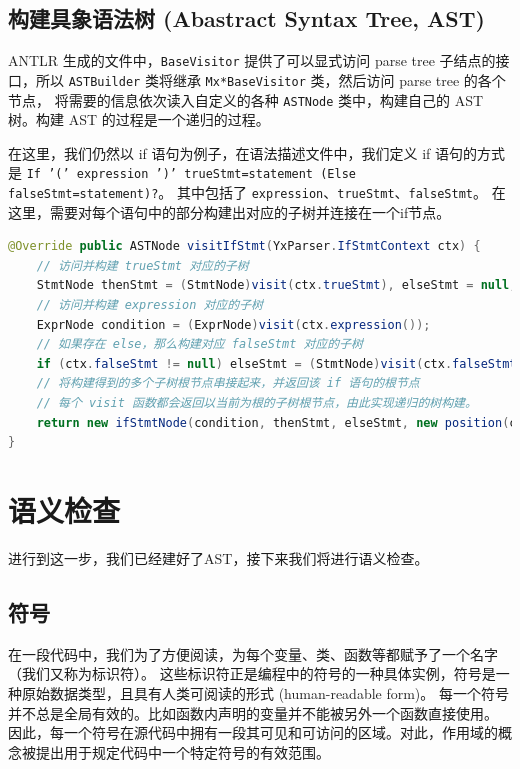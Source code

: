 \subsection{构建具象语法树 (Abastract Syntax Tree, AST)}
ANTLR 生成的文件中，\texttt{BaseVisitor} 提供了可以显式访问 parse tree 子结点的接口，所以
\texttt{ASTBuilder} 类将继承 \texttt{Mx*BaseVisitor} 类，然后访问 parse tree 的各个节点，
将需要的信息依次读入自定义的各种 \texttt{ASTNode} 类中，构建自己的 AST 树。构建 AST 的过程是一个递归的过程。

在这里，我们仍然以 if 语句为例子，在语法描述文件中，我们定义 if 语句的方式是 \texttt{If '(' expression ')' trueStmt=statement (Else falseStmt=statement)?}。
其中包括了 \texttt{expression}、\texttt{trueStmt}、\texttt{falseStmt}。
在这里，需要对每个语句中的部分构建出对应的子树并连接在一个if节点。
\begin{lstlisting}[language=Java]
@Override public ASTNode visitIfStmt(YxParser.IfStmtContext ctx) {
    // 访问并构建 trueStmt 对应的子树
    StmtNode thenStmt = (StmtNode)visit(ctx.trueStmt), elseStmt = null;
    // 访问并构建 expression 对应的子树
    ExprNode condition = (ExprNode)visit(ctx.expression());
    // 如果存在 else，那么构建对应 falseStmt 对应的子树
    if (ctx.falseStmt != null) elseStmt = (StmtNode)visit(ctx.falseStmt);
    // 将构建得到的多个子树根节点串接起来，并返回该 if 语句的根节点
    // 每个 visit 函数都会返回以当前为根的子树根节点，由此实现递归的树构建。
    return new ifStmtNode(condition, thenStmt, elseStmt, new position(ctx));
}
\end{lstlisting}


\section{语义检查}
进行到这一步，我们已经建好了AST，接下来我们将进行语义检查。

\subsection{符号}
在一段代码中，我们为了方便阅读，为每个变量、类、函数等都赋予了一个名字（我们又称为标识符）。
这些标识符正是编程中的符号的一种具体实例，符号是一种原始数据类型，且具有人类可阅读的形式 (human-readable form)。
每一个符号并不总是全局有效的。比如函数内声明的变量并不能被另外一个函数直接使用。
因此，每一个符号在源代码中拥有一段其可见和可访问的区域。对此，作用域的概念被提出用于规定代码中一个特定符号的有效范围。


